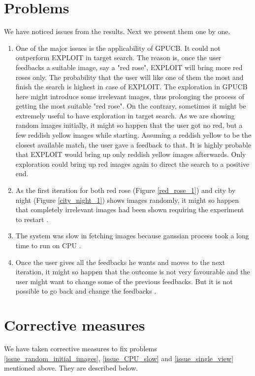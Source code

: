 \documentclass[english]{tktltiki}
\begin{document}
\section{Problems}

We have noticed issues from the results. Next we present them one by one.

\begin{enumerate}
	\item One of the major issues is the applicability of GPUCB. It could not outperform EXPLOIT in target search. The reason is, once the user feedbacks a suitable image, say a "red rose", EXPLOIT will bring more red roses only. The probability that the user will like one of them the most and finish the search is highest in case of EXPLOIT. The exploration in GPUCB here might introduce some irrelevant images, thus prolonging the process of getting the most suitable "red rose". On the contrary, sometimes it might be extremely useful to have exploration in target search. As we are showing random images initially, it might so happen that the user got no red, but a few reddish yellow images while starting. Assuming a reddish yellow to be the closest available match, the user gave a feedback to that. It is highly probable that EXPLOIT would bring up only reddish yellow images afterwards. Only exploration could bring up red images again to direct the search to a positive end.
	\item As the first iteration for both red rose (Figure \ref{red_rose_1}) and city by night (Figure \ref{city_night_1}) shows images randomly, it might so happen that completely irrelevant images had been shown requiring the experiment to restart \label{issue_random_initial_images}.
	\item The system was slow in fetching images because gaussian process took a long time to run on CPU \label{issue_CPU_slow}.
	\item Once the user gives all the feedbacks he wants and moves to the next iteration, it might so happen that the outcome is not very favourable and the user might want to change some of the previous feedbacks. But it is not possible to go back and change the feedbacks \label{issue_single_view}.
\end{enumerate}


\section{Corrective measures}

We have taken corrective measures to fix problems \ref{issue_random_initial_images}, \ref{issue_CPU_slow} and \ref{issue_single_view} mentioned above. They are described below.
\end{document}
